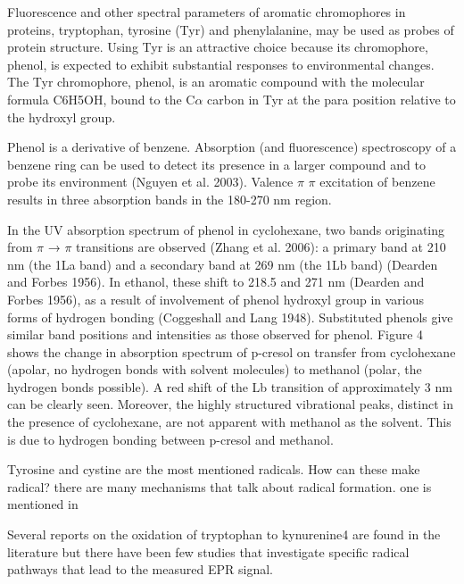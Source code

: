 \documentclass[]{interact}
\theoremstyle{plain}%
\theoremstyle{definition}
\theoremstyle{remark}
\begin{document}
Fluorescence and other spectral parameters of aromatic chromophores in proteins, tryptophan, tyrosine (Tyr) and phenylalanine, may be used as probes of protein structure. Using Tyr is an attractive choice because its chromophore, phenol, is expected to exhibit substantial responses to environmental changes. The Tyr chromophore, phenol, is an aromatic compound with the molecular formula C6H5OH, bound to the C$\alpha$ carbon
in Tyr at the para position relative to the hydroxyl group.

Phenol is a derivative of benzene. Absorption (and fluorescence)
spectroscopy of a benzene ring can be used to detect its presence in a larger compound and to probe its environment (Nguyen et al. 2003). Valence $\pi$ $\pi$  excitation of benzene results in three absorption bands in the
180-270 nm region.

In the UV absorption spectrum of phenol in cyclohexane, two bands originating from $\pi$ → $\pi$  transitions are observed (Zhang et al. 2006): a primary band at 210 nm (the 1La band) and a secondary band at 269 nm (the 1Lb band) (Dearden and Forbes 1956). In ethanol, these shift to 218.5 and 271 nm (Dearden and Forbes 1956), as a result of involvement of phenol hydroxyl group in various forms of hydrogen bonding (Coggeshall and Lang 1948). Substituted phenols give similar band positions and intensities as those
observed for phenol.
Figure 4 shows the change in absorption spectrum of p-cresol on transfer from cyclohexane (apolar, no hydrogen bonds with solvent molecules) to methanol (polar, the hydrogen bonds possible). A red shift of the Lb transition of approximately 3 nm can be clearly seen. Moreover, the highly structured vibrational peaks, distinct in the presence of cyclohexane, are not apparent with methanol as the solvent. This is due to hydrogen bonding between p-cresol and methanol.





Tyrosine and cystine are the most mentioned radicals. How can these make radical? there are many mechanisms that talk about radical formation. one is mentioned in \cite{GROVES2018}




Several reports on the oxidation of tryptophan to kynurenine4 are found in the literature but there have been few studies that investigate specific radical pathways that lead to the measured EPR signal.
\end{document}
